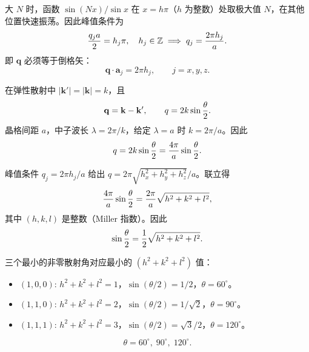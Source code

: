 \begin{solution}
大 $N$ 时，函数 $\sin(Nx)/\sin x$ 在 $x=h\pi$（$h$ 为整数）处取极大值 $N$，在其他位置快速振荡。因此峰值条件为
\[
{q_j a\over2}=h_j\pi,\quad h_j\in\mathbb Z\;\Longrightarrow\;q_j={2\pi h_j\over a}.
\]
即 $\mathbf q$ 必须等于倒格矢：
\[
\boxed{\mathbf q\cdot\mathbf a_j=2\pi h_j,\qquad j=x,y,z.}
\]

在弹性散射中 $|\mathbf k'|=|\mathbf k|=k$，且
\[
\mathbf q=\mathbf k-\mathbf k',\qquad q=2k\sin{\theta\over2}.
\]
晶格间距 $a$，中子波长 $\lambda=2\pi/k$，给定 $\lambda=a$ 时 $k=2\pi/a$。因此
\[
q=2k\sin{\theta\over2}={4\pi\over a}\sin{\theta\over2}.
\]

峰值条件 $q_j=2\pi h_j/a$ 给出 $q=2\pi\sqrt{h_x^2+h_y^2+h_z^2}/a$。联立得
\[
{4\pi\over a}\sin{\theta\over2}={2\pi\over a}\sqrt{h^2+k^2+l^2},
\]
其中 $(h,k,l)$ 是整数（Miller 指数）。因此
\[
\sin{\theta\over2}={1\over2}\sqrt{h^2+k^2+l^2}.
\]

三个最小的非零散射角对应最小的 $(h^2+k^2+l^2)$ 值：
\begin{itemize}
\item $(1,0,0)$: $h^2+k^2+l^2=1$，$\sin(\theta/2)=1/2$，$\theta=60^\circ$。
\item $(1,1,0)$: $h^2+k^2+l^2=2$，$\sin(\theta/2)=1/\sqrt{2}$，$\theta=90^\circ$。
\item $(1,1,1)$: $h^2+k^2+l^2=3$，$\sin(\theta/2)=\sqrt{3}/2$，$\theta=120^\circ$。
\end{itemize}
\[
\boxed{\theta=60^\circ,\;90^\circ,\;120^\circ.}
\]
\end{solution}

